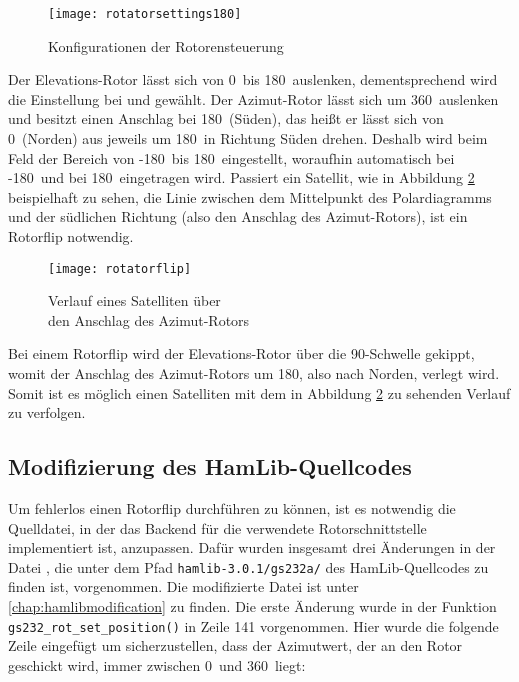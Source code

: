 \begin{figure}[h]
	\centering
	\texttt{[image: rotatorsettings180]}
	\caption{Konfigurationen der Rotorensteuerung}
	\label{fig:rotatorconfig} 
\end{figure}

Der Elevations-Rotor lässt sich von 0\mydegree\ bis 180\mydegree\ auslenken, dementsprechend wird die Einstellung bei  und  gewählt. Der Azimut-Rotor lässt sich um 360\mydegree\ auslenken und besitzt einen Anschlag bei 180\mydegree\ (Süden), das heißt er lässt sich von 0\mydegree\ (Norden) aus jeweils um 180\mydegree\ in Richtung Süden drehen. Deshalb wird beim Feld  der Bereich von -180\mydegree\ bis 180\mydegree\ eingestellt, woraufhin automatisch bei  -180\mydegree\ und bei  180\mydegree\ eingetragen wird.\newpar
Passiert ein Satellit, wie in Abbildung \ref{fig:rotatorflip} beispielhaft zu sehen, die Linie zwischen dem Mittelpunkt des Polardiagramms und der südlichen Richtung (also den Anschlag des Azimut-Rotors), ist ein Rotorflip notwendig.

\begin{figure}[h]
	\centering
	\texttt{[image: rotatorflip]}
	\caption{Verlauf eines Satelliten über \\den Anschlag des Azimut-Rotors}
	\label{fig:rotatorflip} 
\end{figure}

Bei einem Rotorflip wird der Elevations-Rotor über die 90\mydegree-Schwelle gekippt, womit der Anschlag des Azimut-Rotors um 180\mydegree, also nach Norden, verlegt wird. Somit ist es möglich einen Satelliten mit dem in Abbildung \ref{fig:rotatorflip} zu sehenden Verlauf zu verfolgen.

\subsection{Modifizierung des HamLib-Quellcodes}
\label{chap:hamlibmod}

Um fehlerlos einen Rotorflip durchführen zu können, ist es notwendig die Quelldatei, in der das Backend für die verwendete Rotorschnittstelle implementiert ist, anzupassen. Dafür wurden insgesamt drei Änderungen in der Datei , die unter dem Pfad \texttt{hamlib-3.0.1/gs232a/} des HamLib-Quellcodes zu finden ist, vorgenommen. Die modifizierte Datei ist unter \ref{chap:hamlibmodification} zu finden.\newpar
Die erste Änderung wurde in der Funktion \texttt{gs232\_rot\_set\_position()} in Zeile 141 vorgenommen. Hier wurde die folgende Zeile eingefügt um sicherzustellen, dass der Azimutwert, der an den Rotor geschickt wird, immer zwischen 0\mydegree\ und 360\mydegree\ liegt:

